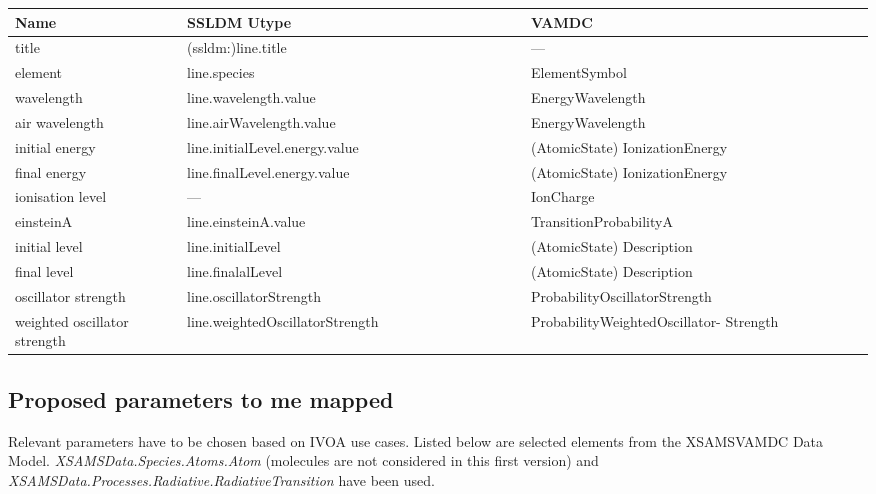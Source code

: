\documentclass[11pt,a4paper]{ivoa}
\begin{document}
\begin{table}[H]
\small
\begin{tabular}{ |p{0.2\linewidth}  |p{0.4\linewidth} | p{0.4\linewidth}| }
\hline

Name & SSLDM Utype & VAMDC \\
\hline
title  &  (ssldm:)line.title  & ---  \\
element  & line.species  & ElementSymbol  \\
wavelength  & line.wavelength.value &  EnergyWavelength  \\
air wavelength & line.airWavelength.value  & EnergyWavelength  \\
initial energy  & line.initialLevel.energy.value & (AtomicState) IonizationEnergy  \\
final energy &  line.finalLevel.energy.value  & (AtomicState) IonizationEnergy  \\
ionisation level & ---  & IonCharge  \\
einsteinA & line.einsteinA.value  & TransitionProbabilityA \\
initial level & line.initialLevel  &  (AtomicState) Description \\
final level & line.finalalLevel  &  (AtomicState) Description \\
oscillator strength & line.oscillatorStrength & ProbabilityOscillatorStrength  \\
weighted oscillator strength & line.weightedOscillatorStrength & ProbabilityWeightedOscillator- Strength \\
\hline
\end{tabular}
\end{table}


\normalsize

\subsection{Proposed parameters to me mapped}

Relevant parameters have to be chosen based on IVOA use cases. Listed below are selected elements from the XSAMSVAMDC Data Model. \textit{XSAMSData.Species.Atoms.Atom} (molecules are not considered in this first version) and
\textit{XSAMSData.Processes.Radiative.RadiativeTransition} have been used.
\end{document}
